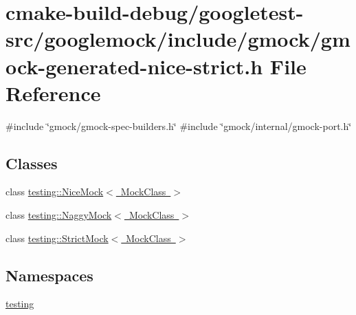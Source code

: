 \hypertarget{gmock-generated-nice-strict_8h}{}\section{cmake-\/build-\/debug/googletest-\/src/googlemock/include/gmock/gmock-\/generated-\/nice-\/strict.h File Reference}
\label{gmock-generated-nice-strict_8h}
{\ttfamily \#include \char`\"{}gmock/gmock-\/spec-\/builders.\+h\char`\"{}}\newline
{\ttfamily \#include \char`\"{}gmock/internal/gmock-\/port.\+h\char`\"{}}\newline
\subsection*{Classes}
\begin{DoxyCompactItemize}
\item 
class \mbox{\hyperlink{classtesting_1_1NiceMock}{testing\+::\+Nice\+Mock$<$ Mock\+Class $>$}}
\item 
class \mbox{\hyperlink{classtesting_1_1NaggyMock}{testing\+::\+Naggy\+Mock$<$ Mock\+Class $>$}}
\item 
class \mbox{\hyperlink{classtesting_1_1StrictMock}{testing\+::\+Strict\+Mock$<$ Mock\+Class $>$}}
\end{DoxyCompactItemize}
\subsection*{Namespaces}
\begin{DoxyCompactItemize}
\item 
 \mbox{\hyperlink{namespacetesting}{testing}}
\end{DoxyCompactItemize}
